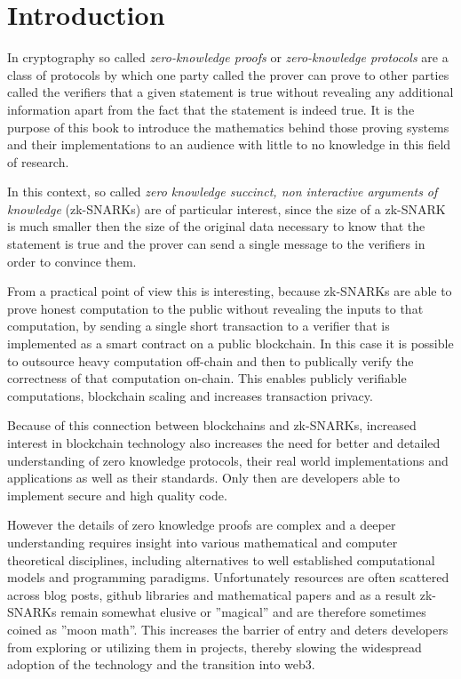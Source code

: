 \chapter{Introduction}
In cryptography so called \textit{zero-knowledge proofs} or \textit{zero-knowledge protocols} are a class of protocols by which one party called the prover can prove to other parties called the verifiers that a given statement is true without revealing any additional information apart from the fact that the statement is indeed true. It is the purpose of this book to introduce the mathematics behind those proving systems and their implementations to an audience with little to no knowledge in this field of research.

In this context, so called \textit{zero knowledge succinct, non interactive arguments of knowledge} (zk-SNARKs) are of particular interest, since the size of a zk-SNARK is much smaller then the size of the original data necessary to know that the statement is true and the prover can send a single message to the verifiers in order to convince them.

From a practical point of view this is interesting, because zk-SNARKs are able to prove honest computation to the public without revealing the inputs to that computation, by sending a single short transaction to a verifier that is implemented as a smart contract on a public blockchain. In this case it is possible to outsource heavy computation off-chain and then to publically verify the correctness of that computation on-chain. This enables publicly verifiable computations, blockchain scaling and increases transaction privacy.  

Because of this connection between blockchains and zk-SNARKs, increased interest in blockchain technology also increases the need for better and detailed understanding of zero knowledge protocols, their real world implementations and applications as well as their standards. Only then are developers able to implement secure and high quality code.

However the details of zero knowledge proofs are complex and a deeper understanding requires insight into various mathematical and computer theoretical disciplines, including alternatives to well established computational models and programming paradigms. Unfortunately resources are often scattered across blog posts, github libraries and mathematical papers and as a result zk-SNARKs remain somewhat elusive or ''magical'' and are therefore sometimes coined as ''moon math''. This increases the barrier of entry and deters developers from exploring or utilizing them in projects, thereby slowing the widespread adoption of the technology and the transition into web3.

